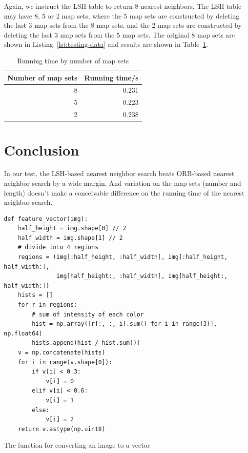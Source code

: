 \documentclass{ee208report}
\begin{document}
\begin{multicols*}{2}
Again, we instruct the LSH table to return 8 nearest neighbors. The LSH table
may have 8, 5 or 2 map sets, where the 5 map sets are constructed by deleting
the last 3 map sets from the 8 map sets, and the 2 map sets are constructed by
deleting the last 3 map sets from the 5 map sets. The original 8 map sets are
shown in Listing~\ref{lst:testing-data} and results are shown in
Table~\ref{tbl:time-by-number}.

\begin{table}[H]
    \centering
    \begin{tabular}{r r }
        \toprule
        Number of map sets & Running time/s \\
        \midrule
        8 & 0.231 \\
        5 & 0.223 \\
        2 & 0.238 \\
        \bottomrule
    \end{tabular}
    \caption{Running time by number of map sets}
    \label{tbl:time-by-number}
\end{table}

\section{Conclusion}

In our test, the LSH-based nearest neighbor search beats ORB-based nearest
neighbor search by a wide margin. And variation on the map sets (number and
length) doesn't make a conceivable difference on the running time of the nearest
neighbor search.

\end{multicols*}

\begin{listing}
    \begin{verbatim}
def feature_vector(img):
    half_height = img.shape[0] // 2
    half_width = img.shape[1] // 2
    # divide into 4 regions
    regions = (img[:half_height, :half_width], img[:half_height, half_width:],
               img[half_height:, :half_width], img[half_height:, half_width:])
    hists = []
    for r in regions:
        # sum of intensity of each color
        hist = np.array([r[:, :, i].sum() for i in range(3)], np.float64)
        hists.append(hist / hist.sum())
    v = np.concatenate(hists)
    for i in range(v.shape[0]):
        if v[i] < 0.3:
            v[i] = 0
        elif v[i] < 0.6:
            v[i] = 1
        else:
            v[i] = 2
    return v.astype(np.uint8)
    \end{verbatim}
    \caption{The function for converting an image to a vector}
    \label{lst:feature-vector}
\end{listing}
\end{document}
